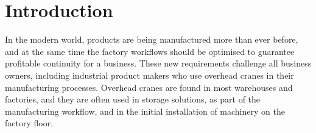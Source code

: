 \documentclass[12pt,a4paper,oneside,pdftex]{report}
\begin{document}




\chapter{Introduction}
\label{chapter:introduction}

In the modern world, products are being manufactured more than ever before, and at the same time the factory workflows should be optimised to guarantee profitable continuity for a business. These new requirements challenge all business owners, including industrial product makers who use overhead cranes in their manufacturing processes. Overhead cranes are found in most warehouses and factories, and they are often used in storage solutions, as part of the manufacturing workflow, and in the initial installation of machinery on the factory floor.
\end{document}
